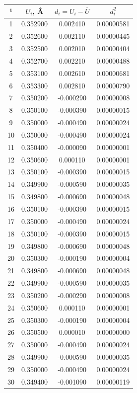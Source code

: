 \begin{tabular}{|c|c|c|c|}
\hline
¹ & $U_i$, Â & $d_i = U_i - \overline{U}$ & $d_i^2$ \\
\hline
1 & 0.352900 & 0.002410 & 0.00000581 \\
2 & 0.352600 & 0.002110 & 0.00000445 \\
3 & 0.352500 & 0.002010 & 0.00000404 \\
4 & 0.352700 & 0.002210 & 0.00000488 \\
5 & 0.353100 & 0.002610 & 0.00000681 \\
6 & 0.353300 & 0.002810 & 0.00000790 \\
7 & 0.350200 & -0.000290 & 0.00000008 \\
8 & 0.350100 & -0.000390 & 0.00000015 \\
9 & 0.350000 & -0.000490 & 0.00000024 \\
10 & 0.350000 & -0.000490 & 0.00000024 \\
11 & 0.350400 & -0.000090 & 0.00000001 \\
12 & 0.350600 & 0.000110 & 0.00000001 \\
13 & 0.350100 & -0.000390 & 0.00000015 \\
14 & 0.349900 & -0.000590 & 0.00000035 \\
15 & 0.349800 & -0.000690 & 0.00000048 \\
16 & 0.350100 & -0.000390 & 0.00000015 \\
17 & 0.350000 & -0.000490 & 0.00000024 \\
18 & 0.350100 & -0.000390 & 0.00000015 \\
19 & 0.349800 & -0.000690 & 0.00000048 \\
20 & 0.350300 & -0.000190 & 0.00000004 \\
21 & 0.349800 & -0.000690 & 0.00000048 \\
22 & 0.349900 & -0.000590 & 0.00000035 \\
23 & 0.350200 & -0.000290 & 0.00000008 \\
24 & 0.350600 & 0.000110 & 0.00000001 \\
25 & 0.350300 & -0.000190 & 0.00000004 \\
26 & 0.350500 & 0.000010 & 0.00000000 \\
27 & 0.350000 & -0.000490 & 0.00000024 \\
28 & 0.349900 & -0.000590 & 0.00000035 \\
29 & 0.350000 & -0.000490 & 0.00000024 \\
30 & 0.349400 & -0.001090 & 0.00000119 \\

\end{tabular}
